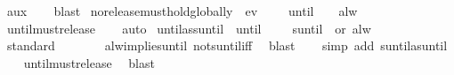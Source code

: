 \begin{isabellebody}
\ aux{}\isanewline
\ \ \isamarkupfalse%
\ blast%
\endisatagproof
{\isafoldproof}%
%
\isadelimproof
\isanewline
%
\endisadelimproof
\isanewline
{}\isamarkupfalse%
\ no{\isacharunderscore}release{\isacharunderscore}must{\isacharunderscore}hold{\isacharunderscore}globally{\isacharcolon}\ {\isachardoublequoteopen}{\isasymnot}\ ev\ {\isasympsi}\ {\isasymomega}\ {\isasymLongrightarrow}\ {\isacharparenleft}{\isasymphi}\ until\ {\isasympsi}{\isacharparenright}\ {\isasymomega}\ {\isasymLongrightarrow}\ alw\ {\isasymphi}\ {\isasymomega}{\isachardoublequoteclose}\isanewline
%
\isadelimproof
\ \ %
\endisadelimproof
%
\isatagproof
{}\isamarkupfalse%
\ until{\isacharunderscore}must{\isacharunderscore}release\isanewline
\ \ \isamarkupfalse%
\ auto%
\endisatagproof
{\isafoldproof}%
%
\isadelimproof
\isanewline
%
\endisadelimproof
\isanewline
{}\isamarkupfalse%
\ until{\isacharunderscore}as{\isacharunderscore}suntil{\isacharcolon}\ {\isachardoublequoteopen}{\isacharparenleft}{\isasymphi}\ until\ {\isasympsi}{\isacharparenright}\ {\isasymomega}\ {\isacharequal}\ {\isacharparenleft}{\isacharparenleft}{\isasymphi}\ suntil\ {\isasympsi}{\isacharparenright}\ or\ {\isacharparenleft}alw\ {\isasymphi}{\isacharparenright}{\isacharparenright}\ {\isasymomega}{\isachardoublequoteclose}\isanewline
%
\isadelimproof
\ \ %
\endisadelimproof
%
\isatagproof
{}\isamarkupfalse%
\ standard\isanewline
\ \ \ \isamarkupfalse%
\isanewline
\ \ \isamarkupfalse%
\ alw{\isacharunderscore}implies{\isacharunderscore}until\ not{\isacharunderscore}suntil{\isacharunderscore}iff\ \isamarkupfalse%
\ blast\isanewline
\ \ \isamarkupfalse%
\ {\isacharparenleft}simp\ add{\isacharcolon}\ suntil{\isacharunderscore}as{\isacharunderscore}until{\isacharparenright}\isanewline
\ \ \isamarkupfalse%
\ until{\isacharunderscore}must{\isacharunderscore}release\ \isamarkupfalse%
\ blast%
\endisatagproof
{\isafoldproof}%
%
\isadelimproof
\isanewline
%
\endisadelimproof
%
\isadelimtheory
\isanewline
%
\endisadelimtheory
%
\isatagtheory
{}\isamarkupfalse%
%
\endisatagtheory
{\isafoldtheory}%
%
\isadelimtheory
%
\endisadelimtheory
%
\end{isabellebody}%
\endinput
